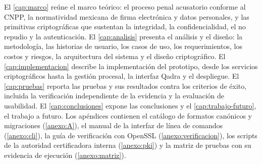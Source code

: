 El \cref{cap:marco} reúne el marco teórico: el proceso penal acusatorio
conforme al CNPP, la normatividad mexicana de firma electrónica y datos
personales, y las primitivas criptográficas que sustentan la integridad, la
confidencialidad, el no repudio y la autenticación. El \cref{cap:analisis}
presenta el análisis y el diseño: la metodología, las historias de usuario,
los casos de uso, los requerimientos, los costos y riesgos, la arquitectura
del sistema y el diseño criptográfico. El \cref{cap:implementacion} describe
la implementación del prototipo, desde los servicios criptográficos hasta la
gestión procesal, la interfaz Qadra y el despliegue. El \cref{cap:pruebas}
reporta las pruebas y sus resultados contra los criterios de éxito, incluida
la verificación independiente de la evidencia y la evaluación de usabilidad.
El \cref{cap:conclusiones} expone las conclusiones y el
\cref{cap:trabajo-futuro}, el trabajo a futuro. Los apéndices contienen el
catálogo de formatos canónicos y migraciones (\cref{anexo:A}), el manual de
la interfaz de línea de comandos (\cref{anexo:cli}), la guía de verificación
con OpenSSL (\cref{anexo:verificacion}), los scripts de la autoridad
certificadora interna (\cref{anexo:pki}) y la matriz de pruebas con su
evidencia de ejecución (\cref{anexo:matriz}).
